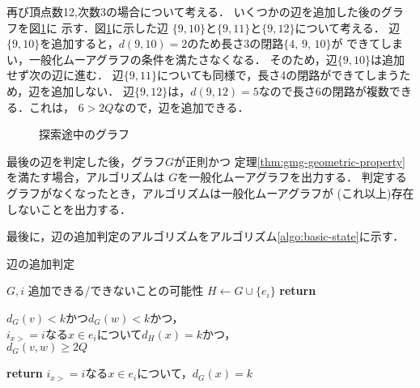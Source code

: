 \begin{example}
  再び頂点数12,次数3の場合について考える．
  いくつかの辺を追加した後のグラフを図\ref{fig:feasible-edges-example2}に
  示す．図\ref{fig:feasible-edges-example2}に示した辺
  $\{9,10\}$と$\{9,11\}$と$\{9,12\}$について考える．
  辺$\{9,10\}$を追加すると，$d(9,10)=2$のため長さ3の閉路$\{4,\,9,\,10\}$が
  できてしまい，一般化ムーアグラフの条件を満たさなくなる．
  そのため，辺$\{9,10\}$は追加せず次の辺に進む．
  辺$\{9,11\}$についても同様で，長さ4の閉路ができてしまうため，辺を追加しない．
  辺$\{9,12\}$は，$d(9,12)=5$なので長さ6の閉路が複数できる．これは，
  $6>2Q$なので，辺を追加できる．
  \begin{figure}
    \centering
    \def\svgwidth{.5\textwidth}
    
    \caption{探索途中のグラフ}
    \label{fig:feasible-edges-example2}
  \end{figure}
\end{example}

最後の辺を判定した後，グラフ$G$が正則かつ
定理\ref{thm:gmg-geometric-property}を満たす場合，アルゴリズムは
$G$を一般化ムーアグラフを出力する．
判定するグラフがなくなったとき，アルゴリズムは一般化ムーアグラフが
(これ以上)存在しないことを出力する．

最後に，辺の追加判定のアルゴリズムをアルゴリズム\ref{algo:basic-state}に示す．
\begin{algorithm}[H]
  \caption{辺の追加判定}
  \label{algo:basic-state}
  \begin{algorithmic}[1]
    \Require $G,i$
    \Ensure 追加できる/できないことの可能性
    \State $H\gets G\cup\{e_i\}$
    \State \textbf{return} \parbox[t]{\linewidth}{
      $d_G(v)<k$かつ$d_G(w)<k$かつ，\\
      $i_{x>}=i$なる$x\in e_i$について$d_H(x)=k$かつ， \\
      $d_G(v,w)\geq2Q$
    }
    \EndProcedure
    \State \textbf{return} $i_{x>}=i$なる$x\in e_i$について，$d_G(x)=k$
    \EndProcedure
  \end{algorithmic}
\end{algorithm}

